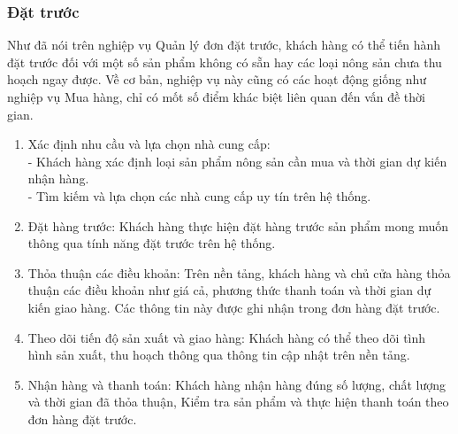         \subsubsection{Đặt trước}
        Như đã nói trên nghiệp vụ Quản lý đơn đặt trước, khách hàng có thể tiến hành đặt trước đối với một số sản phẩm không có sẵn hay các loại nông sản chưa thu hoạch ngay được. Về cơ bản, nghiệp vụ này cũng có các hoạt động giống như nghiệp vụ Mua hàng, chỉ có mốt số điểm khác biệt liên quan đến vấn đề thời gian.
        \begin{enumerate}
            \item Xác định nhu cầu và lựa chọn nhà cung cấp: \\
            - Khách hàng xác định loại sản phẩm nông sản cần mua và thời gian dự kiến nhận hàng.\\
            - Tìm kiếm và lựa chọn các nhà cung cấp uy tín trên hệ thống.
            \item Đặt hàng trước: Khách hàng thực hiện đặt hàng trước sản phẩm mong muốn thông qua tính năng đặt trước trên hệ thống. 
            \item Thỏa thuận các điều khoản: Trên nền tảng, khách hàng và chủ cửa hàng thỏa thuận các điều khoản như giá cả, phương thức thanh toán và thời gian dự kiến giao hàng. Các thông tin này được ghi nhận trong đơn hàng đặt trước.
            \item Theo dõi tiến độ sản xuất và giao hàng: Khách hàng có thể theo dõi tình hình sản xuất, thu hoạch thông qua thông tin cập nhật trên nền tảng.
            \item Nhận hàng và thanh toán: Khách hàng nhận hàng đúng số lượng, chất lượng và thời gian đã thỏa thuận, Kiểm tra sản phẩm và thực hiện thanh toán theo đơn hàng đặt trước.
        \end{enumerate}
